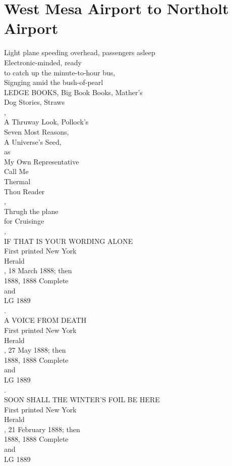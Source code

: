 \documentclass[smalldemyvopaper,11pt,twoside,onecolumn,openright,extrafontsizes]{memoir}
\begin{document}
\chapter{West Mesa Airport to Northolt Airport}
Light plane speeding overhead, passengers asleep
\\Electronic-minded, ready
\\to catch up the minute-to-hour bus,
\\Signging amid the bush-of-pearl
\\LEDGE BOOKS, Big Book Books, Mather's
\\Dog Stories, Straws
\\,
\\A Thruway Look, Pollock's
\\Seven Most Reasons,
\\A Universe's Seed,
\\as
\\My Own Representative
\\Call Me
\\Thermal
\\Thou Reader
\\,
\\Thrugh the plane
\\for Cruisinge
\\,
\\IF THAT IS YOUR WORDING ALONE
\\First printed New York
\\Herald
\\, 18 March 1888; then
\\1888, 1888 Complete
\\and
\\LG 1889
\\.
\\A VOICE FROM DEATH
\\First printed New York
\\Herald
\\, 27 May 1888; then
\\1888, 1888 Complete
\\and
\\LG 1889
\\.
\\SOON SHALL THE WINTER'S FOIL BE HERE
\\First printed New York
\\Herald
\\, 21 February 1888; then
\\1888, 1888 Complete
\\and
\\LG 1889
\end{document}
